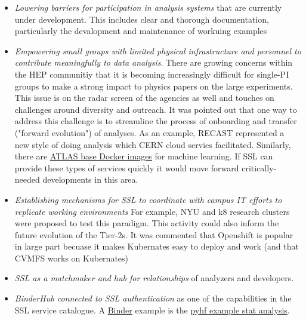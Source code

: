 \documentclass[11pt,letterpaper,fleqn]{article}
\begin{document}
\begin{itemize}
  \item {\it Lowering barriers for participation in analysis systems} that are currently under development. This includes clear and thorough documentation, particularly the devalopment and maintenance of workuing examples
  \item {\it Empowering small groups with limited physical infrastructure and personnel to contribute meaningfully to data analysis}. There are growing concerns within the HEP communitiy that it is becoming increasingly difficult for single-PI groups to make a strong impact to physics papers on the large experiments. This issue is on the radar screen of the agencies as well and touches on challenges around diversity and outreach. It was pointed out that one way to address this challenge is to streamline the process of onboarding and transfer ("forward evolution") of analyses. As an example, RECAST represented a new style of doing analysis which CERN cloud servies facilitated. Similarly, there are \href{https://gitlab.cern.ch/aml/containers/docker}{ATLAS base Docker images} for machine learning. If SSL can provide these types of services quickly it would move forward critically-needed developments in this area.
  \item {\it Establishing mechanisms for SSL to coordinate with campus IT efforts to replicate working environments} For example, NYU and k8 research clusters were proposed to test this paradigm. This activity could also inform the future evolution of the Tier-2s. It was commented that Openshift is popular in large part becuase it makes Kubernates easy to deploy and work (and that CVMFS works on Kubernates)
  \item {\it SSL as a matchmaker and hub for relationships} of analyzers and developers.
  \item {\it BinderHub connected to SSL authentication} as one of the capabilities in the SSL service catalogue. A
  \href{https://mybinder.org/}{Binder} example is the \href{https://mybinder.org/v2/gh/diana-hep/pyhf/master?filepath=docs%2Fexamples%2Fnotebooks%2Fbinderexample%2FStatisticalAnalysis.ipynb}{pyhf example stat analysis}.

\end{itemize}
\end{document}
